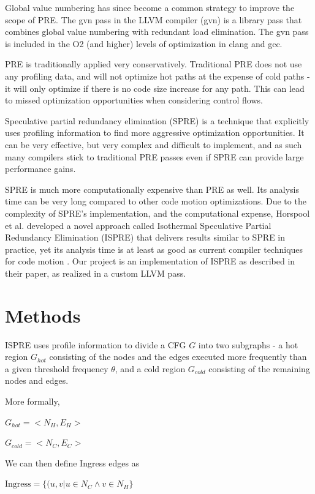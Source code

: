\documentclass[sigplan,screen]{acmart}
\begin{document}
    Global value numbering has since become a common strategy to improve the scope of PRE. The gvn pass in the LLVM compiler (gvn) is a library pass that combines global value numbering with redundant load elimination. The gvn pass is included in the O2 (and higher) levels of optimization in clang and gcc.

    PRE is traditionally applied very conservatively. Traditional PRE does not use any profiling data, and will not optimize hot paths at the expense of cold paths - it will only optimize if there is no code size increase for any path. This can lead to missed optimization opportunities when considering control flows. 

    Speculative partial redundancy elimination (SPRE) is a technique that explicitly uses profiling information to find more aggressive optimization opportunities. It can be very effective, but very complex and difficult to implement, and as such many compilers stick to traditional PRE passes even if SPRE can provide large performance gains.

    SPRE is much more computationally expensive than PRE as well. Its analysis time can be very long compared to other code motion optimizations. Due to the complexity of SPRE's implementation, and the computational expense, Horspool et al. developed a novel approach called Isothermal Speculative Partial Redundancy Elimination (ISPRE) that delivers results similar to SPRE in practice, yet its analysis time is at least as good as current compiler techniques for code motion \cite{ispre_paper}. Our project is an implementation of ISPRE as described in their paper, as realized in a custom LLVM pass. 

    \section{Methods}
	\label{sec:methods}

    ISPRE uses profile information to divide a CFG $G$ into two subgraphs - a hot region $G_{hot}$ consisting of the nodes and the edges executed more frequently than a given threshold frequency $\theta$, and a cold region $G_{cold}$ consisting of the remaining nodes and edges. 
    
    More formally, 
 
    $G_{hot} = <N_H, E_H>$  
    
    $G_{cold} = <N_C, E_C>$

    We can then define Ingress edges as

    $\text{Ingress} = \{(u,v | u \in N_C \wedge v \in N_H \}$   
\end{document}
